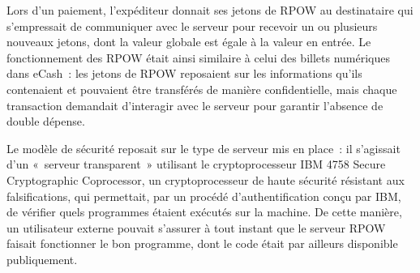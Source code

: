Lors d'un paiement, l'expéditeur donnait ses jetons de RPOW au destinataire qui s'empressait de communiquer avec le serveur pour recevoir un ou plusieurs nouveaux jetons, dont la valeur globale est égale à la valeur en entrée. Le fonctionnement des RPOW était ainsi similaire à celui des billets numériques dans eCash~: les jetons de RPOW reposaient sur les informations qu'ils contenaient et pouvaient être transférés de manière confidentielle, mais chaque transaction demandait d'interagir avec le serveur pour garantir l'absence de double dépense.

Le modèle de sécurité reposait sur le type de serveur mis en place~: il s'agissait d'un «~serveur transparent~» utilisant le cryptoprocesseur IBM 4758 Secure Cryptographic Coprocessor, un cryptoprocesseur de haute sécurité résistant aux falsifications, qui permettait, par un procédé d'authentification conçu par IBM, de vérifier quels programmes étaient exécutés sur la machine. De cette manière, un utilisateur externe pouvait s'assurer à tout instant que le serveur RPOW faisait fonctionner le bon programme, dont le code était par ailleurs disponible publiquement.

